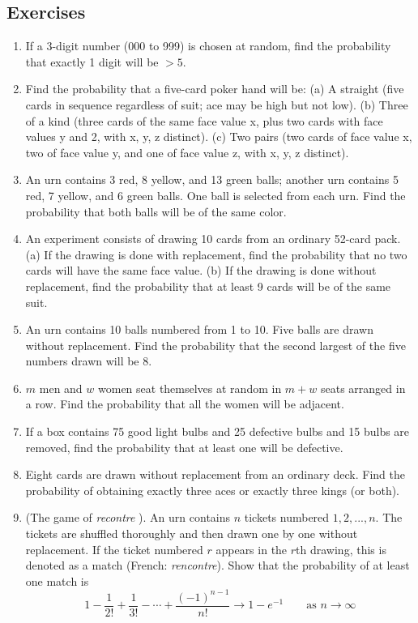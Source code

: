 \documentclass[../main.tex]{subfiles}
\begin{document}
{\fontsize{10}{10}\selectfont

\subsection{Exercises} %
\begin{enumerate}
	\item If a 3-digit number (000 to 999) is chosen at random, find the probability that
	exactly 1 digit will be $>5$.
	\item  Find the probability that a five-card poker hand will be:
	(a) A straight (five cards in sequence regardless of suit; ace may be high but
	not low).
	(b) Three of a kind (three cards of the same face value x, plus two cards with
	face values y and 2, with x, y, z distinct).
	(c) Two pairs (two cards of face value x, two of face value y, and one of face
	value z, with x, y, z distinct).
	\item  An urn contains 3 red, 8 yellow, and 13 green balls; another urn contains 5
	red, 7 yellow, and 6 green balls. One ball is selected from each urn. Find the
	probability that both balls will be of the same color.
	\item  An experiment consists of drawing 10 cards from an ordinary 52-card pack.
	(a) If the drawing is done with replacement, find the probability that no two
	cards will have the same face value.
	(b) If the drawing is done without replacement, find the probability that at
	least 9 cards will be of the same suit.
	\item  An urn contains 10 balls numbered from 1 to 10. Five balls are drawn without
	replacement. Find the probability that the second largest of the five numbers
	drawn will be 8.
	\item  $m$ men and $w$ women seat themselves at random in $m + w$ seats arranged in a
	row. Find the probability that all the women will be adjacent.
	\item  If a box contains 75 good light bulbs and 25 defective bulbs and 15 bulbs are
	removed, find the probability that at least one will be defective.
	\item  Eight cards are drawn without replacement from an ordinary deck. Find the
	probability of obtaining exactly three aces or exactly three kings (or both).
	\item (The game of \textit{recontre} ). An urn contains $n$ tickets numbered $1,2,...,n$.
	The tickets are shuffled thoroughly and then drawn one by one without replacement.
	If the ticket numbered $r$ appears in the $r$th drawing, this is denoted
	as a match (French: \textit{rencontre}). Show that the probability of at least one match
	is
	$$ 1 - \frac{1}{2!} + \frac{1}{3!} - \cdots + \frac{(-1)^{n-1}}{n!}
	\rightarrow 1 - e^{-1} \qquad \mbox{as } n \rightarrow \infty$$
	

\end{enumerate}}
\end{document}
